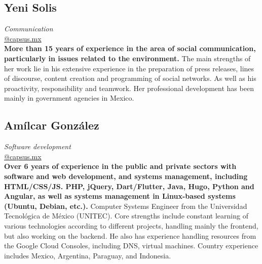 \documentclass[
	a4paper,
	12pt,
	unnumberedsections,
]{CSSullivanBusinessReport}
\begin{document}
\subsection*{Yeni Solis}
\textit{Communication} \\
\href{mailto:@capsus.mx}{@capsus.mx} \\[0.5em]
\textbf{More than 15 years of experience in the area of social communication, particularly in issues related to the environment.} The main strengths of her work lie in his extensive experience in the preparation of press releases, lines of discourse, content creation and programming of social networks. As well as his proactivity, responsibility and teamwork. Her professional development has been mainly in government agencies in Mexico.

\subsection*{Amílcar González}
\textit{Software development} \\
\href{mailto:@capsus.mx}{@capsus.mx} \\[0.5em]
\textbf{Over 6 years of experience in the public and private sectors with software and web development, and systems management, including HTML/CSS/JS. PHP, jQuery, Dart/Flutter, Java, Hugo, Python and Angular, as well as systems management in Linux-based systems (Ubuntu, Debian, etc.).} Computer Systems Engineer from the Universidad Tecnológica de México (UNITEC). Core strengths include constant learning of various technologies according to different projects, handling mainly the frontend, but also working on the backend. He also has experience handling resources from the Google Cloud Consoles, including DNS, virtual machines. Country experience includes Mexico, Argentina, Paraguay, and Indonesia.
\end{document}
